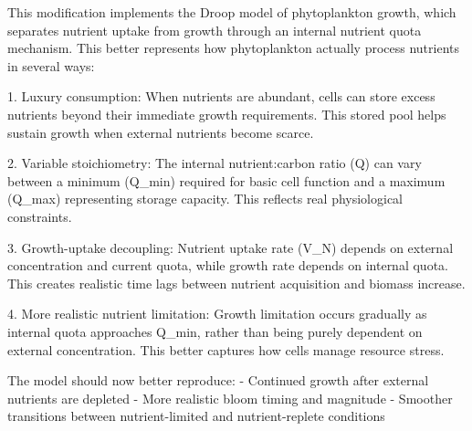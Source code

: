 This modification implements the Droop model of phytoplankton growth, which separates nutrient uptake from growth through an internal nutrient quota mechanism. This better represents how phytoplankton actually process nutrients in several ways:

1. Luxury consumption: When nutrients are abundant, cells can store excess nutrients beyond their immediate growth requirements. This stored pool helps sustain growth when external nutrients become scarce.

2. Variable stoichiometry: The internal nutrient:carbon ratio (Q) can vary between a minimum (Q_min) required for basic cell function and a maximum (Q_max) representing storage capacity. This reflects real physiological constraints.

3. Growth-uptake decoupling: Nutrient uptake rate (V_N) depends on external concentration and current quota, while growth rate depends on internal quota. This creates realistic time lags between nutrient acquisition and biomass increase.

4. More realistic nutrient limitation: Growth limitation occurs gradually as internal quota approaches Q_min, rather than being purely dependent on external concentration. This better captures how cells manage resource stress.

The model should now better reproduce:
- Continued growth after external nutrients are depleted
- More realistic bloom timing and magnitude
- Smoother transitions between nutrient-limited and nutrient-replete conditions
